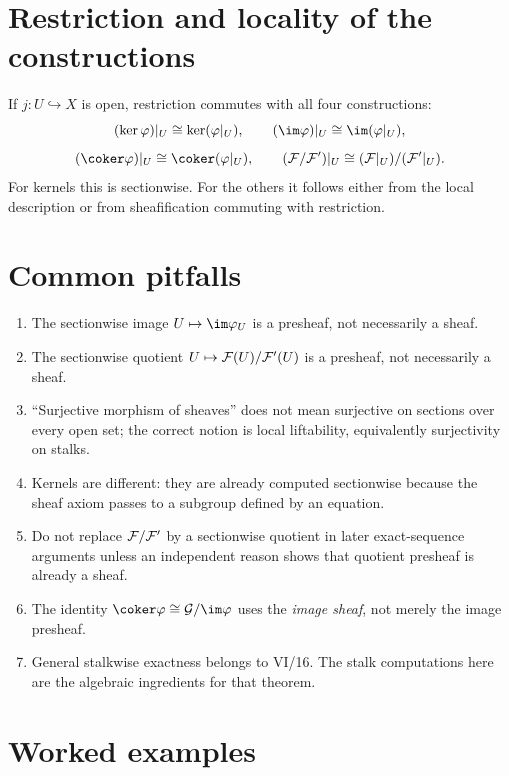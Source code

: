 

\section{Restriction and locality of the constructions}

If $j:U\hookrightarrow X$ is open, restriction commutes with all four constructions:
\[
(\ker\varphi)|_U\cong\ker(\varphi|_U),\qquad
(\im\varphi)|_U\cong\im(\varphi|_U),
\]
\[
(\coker\varphi)|_U\cong\coker(\varphi|_U),\qquad
(\F/\F')|_U\cong(\F|_U)/(\F'|_U).
\]
For kernels this is sectionwise.  For the others it follows either from the local
description or from sheafification commuting with restriction.

\section{Common pitfalls}
\begin{enumerate}
\item The sectionwise image $U\mapsto\im\varphi_U$ is a presheaf, not necessarily a sheaf.
\item The sectionwise quotient $U\mapsto\mathcal F(U)/\mathcal F'(U)$ is a presheaf, not necessarily a sheaf.
\item ``Surjective morphism of sheaves'' does not mean surjective on sections over every open
set; the correct notion is local liftability, equivalently surjectivity on stalks.
\item Kernels are different: they are already computed sectionwise because the sheaf axiom
passes to a subgroup defined by an equation.
\item Do not replace $\mathcal F/\mathcal F'$ by a sectionwise quotient in later exact-sequence arguments
unless an independent reason shows that quotient presheaf is already a sheaf.
\item The identity $\coker\varphi\cong\G/\im\varphi$ uses the \emph{image sheaf}, not merely
the image presheaf.
\item General stalkwise exactness belongs to VI/16.  The stalk computations here are the
algebraic ingredients for that theorem.
\end{enumerate}

\section{Worked examples}


